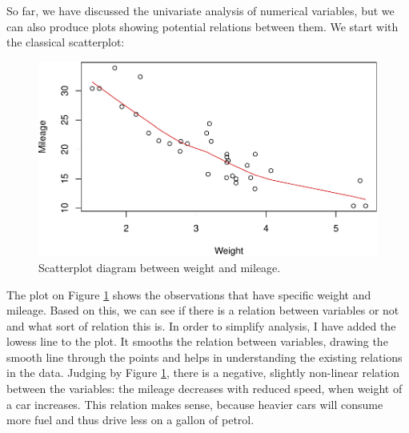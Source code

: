 \documentclass[
]{book}
\newenvironment{Shaded}{\begin{snugshade}}{\end{snugshade}}
\newcommand{\AttributeTok}[1]{\textcolor[rgb]{0.13,0.29,0.53}{#1}}
\newcommand{\FunctionTok}[1]{\textcolor[rgb]{0.13,0.29,0.53}{\textbf{#1}}}
\newcommand{\NormalTok}[1]{#1}
\newcommand{\SpecialCharTok}[1]{\textcolor[rgb]{0.81,0.36,0.00}{\textbf{#1}}}
\newcommand{\StringTok}[1]{\textcolor[rgb]{0.31,0.60,0.02}{#1}}
\theoremstyle{definition}
\theoremstyle{definition}
\theoremstyle{definition}
\theoremstyle{definition}
\theoremstyle{remark}
\begin{document}
So far, we have discussed the univariate analysis of numerical variables, but we can also produce plots showing potential relations between them. We start with the classical scatterplot:

\begin{Shaded}
\end{Shaded}

\begin{figure}
\centering
\includegraphics{Svetunkov---Statistics-for-Business-Analytics_files/figure-latex/scatterWeightMPG-1.pdf}
\caption{\label{fig:scatterWeightMPG}Scatterplot diagram between weight and mileage.}
\end{figure}

The plot on Figure \ref{fig:scatterWeightMPG} shows the observations that have specific weight and mileage. Based on this, we can see if there is a relation between variables or not and what sort of relation this is. In order to simplify analysis, I have added the lowess line to the plot. It smooths the relation between variables, drawing the smooth line through the points and helps in understanding the existing relations in the data. Judging by Figure \ref{fig:scatterWeightMPG}, there is a negative, slightly non-linear relation between the variables: the mileage decreases with reduced speed, when weight of a car increases. This relation makes sense, because heavier cars will consume more fuel and thus drive less on a gallon of petrol.
\end{document}
